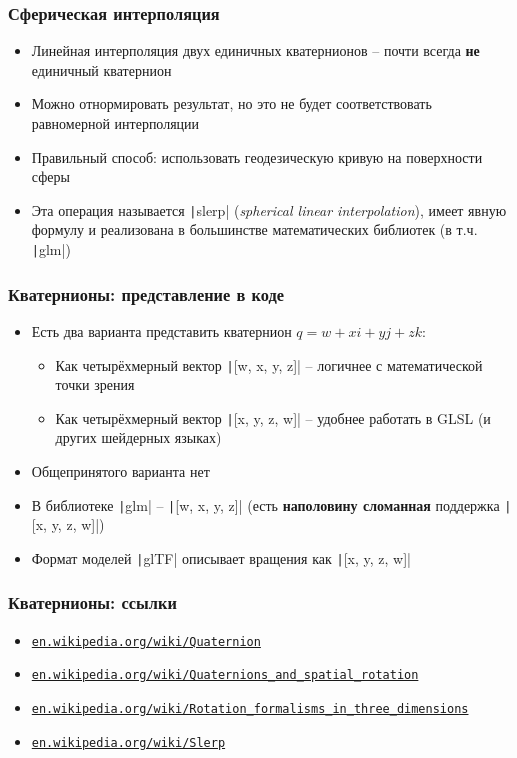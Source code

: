 \documentclass[10pt]{beamer}
\begin{document}
\begin{frame}[fragile]
\frametitle{Сферическая интерполяция}
\begin{itemize}
\item Линейная интерполяция двух единичных кватернионов -- почти всегда \textbf{не} единичный кватернион
\pause
\item Можно отнормировать результат, но это не будет соответствовать равномерной интерполяции
\pause
\item Правильный способ: использовать геодезическую кривую на поверхности сферы
\pause
\item Эта операция называется \texttt|slerp| (\textit{spherical linear interpolation}), имеет явную формулу и реализована в большинстве математических библиотек (в т.ч. \texttt|glm|)
\end{itemize}
\end{frame}

\begin{frame}[fragile]
\frametitle{Кватернионы: представление в коде}
\begin{itemize}
\item Есть два варианта представить кватернион \begin{math}q = w + xi + yj + zk\end{math}:
\pause
\begin{itemize}
\item Как четырёхмерный вектор \texttt|[w, x, y, z]| -- логичнее с математической точки зрения
\item Как четырёхмерный вектор \texttt|[x, y, z, w]| -- удобнее работать в GLSL (и других шейдерных языках)
\end{itemize}
\pause
\item Общепринятого варианта нет
\item В библиотеке \texttt|glm| -- \texttt|[w, x, y, z]| (есть \alert{\textbf{наполовину сломанная}} поддержка \texttt|[x, y, z, w]|)
\item Формат моделей \texttt|glTF| описывает вращения как \texttt|[x, y, z, w]|
\end{itemize}
\end{frame}

\begin{frame}[fragile]
\frametitle{Кватернионы: ссылки}
\fontsize{8pt}{8pt}
\selectfont
\begin{itemize}
\item \href{https://en.wikipedia.org/wiki/Quaternion}{\texttt{en.wikipedia.org/wiki/Quaternion}}
\item \href{https://en.wikipedia.org/wiki/Quaternions_and_spatial_rotation}{\texttt{en.wikipedia.org/wiki/Quaternions\_and\_spatial\_rotation}}
\item \href{https://en.wikipedia.org/wiki/Rotation_formalisms_in_three_dimensions}{\texttt{en.wikipedia.org/wiki/Rotation\_formalisms\_in\_three\_dimensions}}
\item \href{https://en.wikipedia.org/wiki/Slerp}{\texttt{en.wikipedia.org/wiki/Slerp}}
\end{itemize}
\end{frame}
\end{document}
